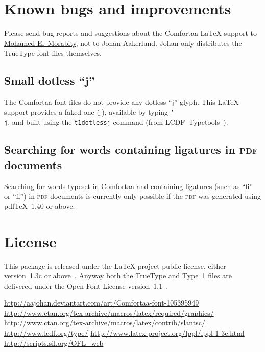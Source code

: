 \documentclass{article}
\newcommand{\acronym}[1]{\textsc{\lowercase{#1}}}
\newcommand{\code}{\texttt}
\newcommand{\command}{\texttt}
\newcommand{\name}{}
\newcommand{\program}{}
\begin{document}
\section{Known bugs and improvements}

Please send bug reports and suggestions about the Comfortaa \LaTeX{} support to
\href{mailto:melmorabity@fedoraproject.org}{Mohamed \name{El~Morabity}}, not to
Johan \name{Aakerlund}. Johan only distributes the TrueType font files
themselves.

\subsection{Small dotless ``j''}

The Comfortaa font files do not provide any dotless ``j'' glyph. This \LaTeX{}
support provides a faked one ({\fcofamily\j}), available by typing
\code{\char`\\j}, and built using the \command{t1dotlessj} command (from
LCDF~Typetools~\cite{lcdf}).

\subsection{Searching for words containing ligatures in \acronym{PDF} documents}

Searching for words typeset in Comfortaa and containing ligatures (such as
``fi'' or ``fl'') in \acronym{PDF} documents is currently only possible if the
\acronym{PDF} was generated using \program{pdf\TeX}~1.40 or above.

\section{License}

This package is released under the \LaTeX{} project public license, either
version~1.3c or above~\cite{lppl}. Anyway both the TrueType and Type~1 files are
delivered under the Open Font License version~1.1~\cite{ofl}.

\begin{thebibliography}{9}
  \url{http://aajohan.deviantart.com/art/Comfortaa-font-105395949}
  \url{http://www.ctan.org/tex-archive/macros/latex/required/graphics/}
  \url{http://www.ctan.org/tex-archive/macros/latex/contrib/slantsc/}
 \url{http://www.lcdf.org/type/}
 \url{http://www.latex-project.org/lppl/lppl-1-3c.html}
 \url{http://scripts.sil.org/OFL_web}
\end{thebibliography}
\end{document}
